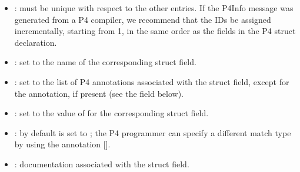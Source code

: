 \documentclass[11pt]{article}
\begin{document}
{\begin{enumerate}[,start=2]
\begin{itemize}[noitemsep,topsep=\mdcompacttopsep]%

\item{}: must be unique with respect to the other  entries. If the P4Info
message was generated from a P4 compiler, we recommend that the IDs be
assigned incrementally, starting from 1, in the same order as the fields in
the P4 struct declaration.%

\item{}: set to the name of the corresponding struct field.%

\item{}: set to the list of P4 annotations associated with the struct
field, except for the  annotation, if present (see the  field
below).%

\item{}: set to the value of  for the corresponding struct field.%

\item{}: by default  is set to ; the P4 programmer can
specify a different match type by using the  annotation
[].%

\item{}: documentation associated with the struct field.%
\end{itemize}%
\end{enumerate}%

}
\end{document}
